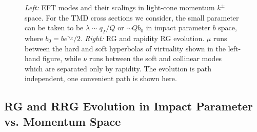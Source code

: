 \documentclass[a4,letterpaper,11pt]{article}
\begin{document}
\begin{figure}
\centerline{ }
\vskip-0.2cm
\caption[1]{\emph{Left:} EFT modes and their scalings in light-cone momentum $k^\pm$ space. For the TMD cross sections we consider, the small parameter can be taken to be $\lambda \sim q_T/Q$ or $\sim Qb_0$ in impact parameter $b$ space, where $b_0 = be^{\gamma_E}/2$. \emph{Right:} RG and rapidity RG evolution. $\mu$ runs between the hard and soft hyperbolas of virtuality shown in the left-hand figure, while $\nu$ runs between the soft and collinear modes which are separated only by rapidity. The evolution is path independent, one convenient path is shown here.}
\label{fig:modes} 
\end{figure}


\subsection{RG and RRG Evolution in Impact Parameter vs. Momentum Space}
\end{document}
